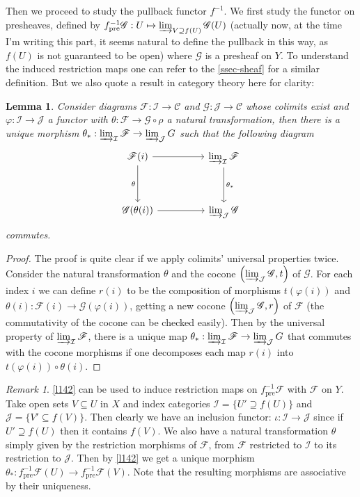 \documentclass[12pt]{article}
\newtheorem{lemma}{Lemma}[subsection]
\theoremstyle{remark}
\newtheorem*{remark}{Remark}
\begin{document}
	Then we proceed to study the pullback functor $f^{-1}$. We first study the functor on presheaves, defined by $f_{\text{pre}}^{-1}\mathscr G:U\mapsto \varinjlim_{V\supseteq f(U)}\mathscr G(U)$ (actually now, at the time I'm writing this part, it seems natural to define the pullback in this way, as $f(U)$ is not guaranteed to be open) where $\mathscr G$ is a presheaf on $Y$. To understand the induced restriction maps one can refer to the \autoref{ssec-sheaf} for a similar definition. But we also quote a result in category theory here for clarity:
	\begin{lemma}\label{l142}
		Consider diagrams $\mathscr F:\mathcal I\to \mathcal C$ and $\mathscr G:\mathcal J\to \mathcal C$ whose colimits exist and $\varphi:\mathcal I\to\mathcal J$ a functor with $\theta:\mathscr F\to \mathscr G\circ\rho$ a natural transformation, then there is a unique morphism $\theta_*:\varinjlim_{\mathcal I} \mathscr F\to\varinjlim_{\mathcal J}G$ such that the following diagram
		\[
			\begin{tikzcd}
				\mathscr F(i) \arrow[rr] \arrow[dd, "\theta"'] &  & \varinjlim_{\mathcal I}\mathscr F \arrow[dd, "\theta_*"] \\
															   &  &                                                          \\
				\mathscr{G}(\theta(i)) \arrow[rr]              &  & \varinjlim_{\mathcal J}\mathscr G                       
				\end{tikzcd}	
		\]
		commutes.
	\end{lemma}
	\begin{proof}
		The proof is quite clear if we apply colimits' universal properties twice. Consider the natural transformation $\theta$ and the cocone $\left(\varinjlim_{\mathcal J} \mathscr G, t\right)$ of $\mathscr G$. For each index $i$ we can define $r(i)$ to be the composition of morphisms $t(\varphi(i))$ and $\theta(i):\mathscr F(i)\to \mathscr G(\varphi(i))$, getting a new cocone $\left(\varinjlim_{\mathcal J}\mathscr  G, r\right)$ of $\mathscr F$ (the commutativity of the cocone can be checked easily). Then by the universal property of $\varinjlim_{\mathcal I} \mathscr F$, there is a unique map $\theta_*:\varinjlim_{\mathcal I} \mathscr F\to\varinjlim_{\mathcal J}G$ that commutes with the cocone morphisms if one decomposes each map $r(i)$ into $t(\varphi(i))\circ\theta(i)$.
	\end{proof}
	\begin{remark}
		\autoref{l142} can be used to induce restriction maps on $f_{\mathrm{pre}}^{-1}\mathscr F$ with $\mathscr F$ on $Y$. Take open sets $V\subseteq U$ in $X$ and index categories $\mathcal I=\{U'\supseteq f(U)\}$ and $\mathcal J=\{V'\subseteq f(V)\}$. Then clearly we have an inclusion functor: $\iota:\mathcal I\to\mathcal J$ since if $U'\supseteq f(U)$ then it contains $f(V)$. We also have a natural transformation $\theta$ simply given by the restriction morphisms of $\mathscr F$, from $\mathscr F$ restricted to $\mathcal I$ to its restriction to $\mathcal J$. Then by \autoref{l142} we get a unique morphism $\theta_*:f_{\mathrm{pre}}^{-1}\mathscr F(U)\to f_{\mathrm{pre}}^{-1}\mathscr F(V)$. Note that the resulting morphisms are associative by their uniqueness.
	\end{remark}
\end{document}
